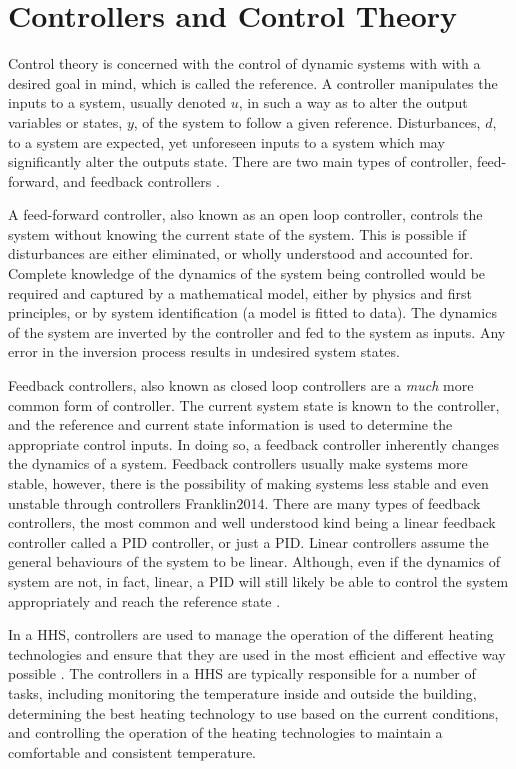 \section{Controllers and Control Theory}
Control theory is concerned with the control of dynamic systems with with a desired goal in mind, which is called the reference. A controller manipulates the inputs to a system, usually denoted $u$, in such a way as to alter the output variables or states, $y$, of the system to follow a given reference. Disturbances, $d$, to a system are expected, yet unforeseen inputs to a system which may significantly alter the outputs state.  There are two main types of controller, feed-forward, and feedback controllers \cite{Franklin2014}.

A feed-forward controller, also known as an open loop controller, controls the system without knowing the current state of the system. This is possible if disturbances are either eliminated, or wholly understood and accounted for. Complete knowledge of the dynamics of the system being controlled would be required and captured by a mathematical model, either by physics and first principles, or by system identification (a model is fitted to data). The dynamics of the system are inverted by the controller and fed to the system as inputs. Any error in the inversion process results in undesired system states. 

Feedback controllers, also known as closed loop controllers are a \textit{much} more common form of controller. The current system state is known to the controller, and the reference and current state information is used to determine the appropriate control inputs. In doing so, a feedback controller inherently changes the dynamics of a system. Feedback controllers usually make systems more stable, however, there is the possibility of making systems less stable and even unstable through controllers {Franklin2014}. There are many types of feedback controllers, the most common and well understood kind being a linear feedback controller called a \ac{PID} controller, or just a \ac{PID}. Linear controllers assume the general behaviours of the system to be linear. Although, even if the dynamics of system are not, in fact, linear, a \ac{PID} will still likely be able to control the system appropriately and reach the reference state \cite{Rames_2012}.

In a \ac{HHS}, controllers are used to manage the operation of the different heating technologies and ensure that they are used in the most efficient and effective way possible \cite{di_perna_experimental_2015,bagarella_annual_2016,roccatello_analysis_2022,demirezen_feasibility_2021,mugnini_variable-load_2021,bianco_estimation_2017}. The controllers in a \ac{HHS} are typically responsible for a number of tasks, including monitoring the temperature inside and outside the building, determining the best heating technology to use based on the current conditions, and controlling the operation of the heating technologies to maintain a comfortable and consistent temperature.

